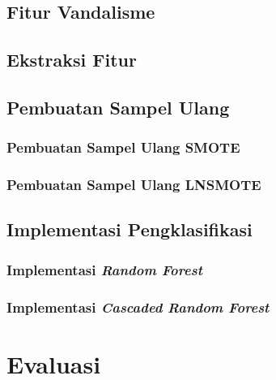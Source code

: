 \documentclass[12pt,a4paper,titlepage]{report}
\begin{document}
\section{Fitur Vandalisme}
\label{section:fitur_vandalisme}


\section{Ekstraksi Fitur}


\section{Pembuatan Sampel Ulang}


\subsection{Pembuatan Sampel Ulang SMOTE}

\newpage


\newpage
\subsection{Pembuatan Sampel Ulang LNSMOTE}



\newpage
\section{Implementasi Pengklasifikasi}


\subsection{Implementasi \textit{Random Forest}}
\label{subsection:implementasi_rf}



\subsection{Implementasi \textit{Cascaded Random Forest}}
\label{subsection:implementasi_crf}


\newpage


\chapter{Evaluasi}
\label{bab:evaluasi}

\end{document}
